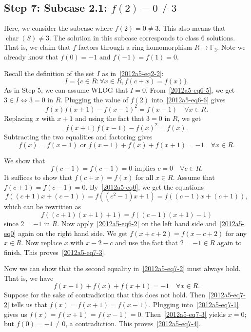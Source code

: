 \documentclass{article}
\newcommand{\F}{\mathbb{F}}
\DeclareMathOperator{\rchar}{char}
\begin{document}
\subsection*{Step 7: Subcase 2.1: $f(2) = 0 \neq 3$}

Here, we consider the subcase where $f(2) = 0 \neq 3$.
This also means that $\rchar(S) \neq 3$.
The solution in this subcase corresponds to class 6 solutions.
That is, we claim that $f$ factors through a ring homomorphism $R \to \F_3$.
Note we already know that $f(0) = -1$ and $f(-1) = f(1) = 0$.

Recall the definition of the set $I$ as in~\eqref{2012a5-eq2-2}:
\[ I = \{c \in R : \forall x \in R, f(c + x) = f(x)\}. \]
As in Step 5, we can assume WLOG that $I = 0$.
From~\eqref{2012a5-eq6-5}, we get $3 \in I \iff 3 = 0$ in $R$.
Plugging the value of $f(2)$ into~\eqref{2012a5-eq6-6} gives
\[ f(x) f(x + 1) - f(x - 1)^2 = f(x - 1) \quad \forall x \in R. \tag{7.1}\label{2012a5-eq7-1} \]
Replacing $x$ with $x + 1$ and using the fact that $3 = 0$ in $R$, we get
\[ f(x + 1) f(x - 1) - f(x)^2 = f(x). \]
Subtracting the two equalities and factoring gives
\[ f(x) = f(x - 1) \text{ or } f(x - 1) + f(x) + f(x + 1) = -1 \quad \forall x \in R. \tag{7.2}\label{2012a5-eq7-2} \]

We show that
\[ f(c + 1) = f(c - 1) = 0 \text{ implies } c = 0 \quad \forall c \in R. \tag{7.3}\label{2012a5-eq7-3} \]
It suffices to show that $f(c + x) = f(x)$ for all $x \in R$.
Assume that $f(c + 1) = f(c - 1) = 0$.
By~\eqref{2012a5-eq0}, we get the equations
\[ f((c + 1) x + (c - 1)) = f((c^2 - 1) x + 1) = f((c - 1) x + (c + 1)), \]
    which can be rewritten as
\[ f((c + 1)(x + 1) + 1) = f((c - 1)(x + 1) - 1) \]
    since $2 = -1$ in $R$.
Now apply~\eqref{2012a5-eq6-2} on the left hand side and~\eqref{2012a5-eq0} again on the right hand side.
We get $f(x + c + 2) = f(x - c + 2)$ for any $x \in R$.
Now replace $x$ with $x - 2 - c$ and use the fact that $2 = -1 \in R$ again to finish.
This proves~\eqref{2012a5-eq7-3}.

Now we can show that the second equality in~\eqref{2012a5-eq7-2} must always hold.
That is, we have
\[ f(x - 1) + f(x) + f(x + 1) = -1 \quad \forall x \in R. \tag{7.4}\label{2012a5-eq7-4} \]
Suppose for the sake of contradiction that this does not hold.
Then~\eqref{2012a5-eq7-2} tells us that $f(x) = f(x + 1) = f(x - 1)$.
Plugging into~\eqref{2012a5-eq7-1} gives us $f(x) = f(x + 1) = f(x - 1) = 0$.
Then~\eqref{2012a5-eq7-3} yields $x = 0$; but $f(0) = -1 \neq 0$, a contradiction.
This proves~\eqref{2012a5-eq7-4}.
\end{document}
